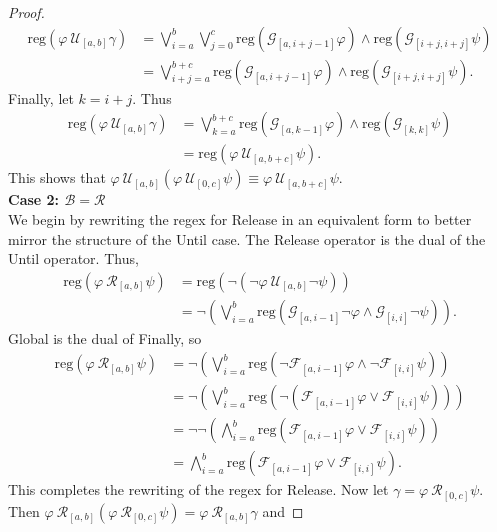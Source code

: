 \documentclass[runningheads]{llncs}
\renewcommand{\phi}{\varphi}
\begin{document}
\begin{proof}
\begin{align*}
\text{reg}\left(\phi \ \mathcal{U}_{[a,b]}\gamma\right) &= \bigvee_{i=a}^{b}  \bigvee_{j=0}^{c} \text{reg}\left(\mathcal{G}_{[a,i+j-1]}\phi\right) \land \text{reg}\left(\mathcal{G}_{[i+j, i+j]}\psi  \right)\\
&= \bigvee_{i+j=a}^{b+c} \text{reg}\left(\mathcal{G}_{[a,i+j-1]}\phi\right) \land \text{reg}\left(\mathcal{G}_{[i+j, i+j]}\psi  \right).
\end{align*}
Finally, let $k = i + j$. Thus
\begin{align*}
\text{reg}\left(\phi \ \mathcal{U}_{[a,b]}\gamma\right) &= \bigvee_{k=a}^{b+c} \text{reg}\left(\mathcal{G}_{[a,k-1]}\phi\right) \land \text{reg}\left(\mathcal{G}_{[k, k]}\psi  \right) \\
&= \text{reg}\left(\phi \ \mathcal{U}_{[a,b+c]} \psi\right).
\end{align*}
This shows that $\phi \ \mathcal{U}_{[a,b]}(\phi \ \mathcal{U}_{[0,c]} \psi) \equiv \phi \ \mathcal{U}_{[a,b+c]} \psi$.\\
\noindent \textbf{Case 2: $\mathbf{\mathcal{B} = \mathcal{R}}$} \\
We begin by rewriting the regex for Release in an equivalent form to better mirror the structure of the Until case. The Release operator is the dual of the Until operator. Thus,
\begin{align*}
\text{reg}\left(\phi \ \mathcal{R}_{[a,b]}\psi\right) &= \text{reg}\left(\neg\left(\neg\phi \ \mathcal{U}_{[a,b]}\neg\psi\right)\right) \\
&= \neg\left(\bigvee_{i=a}^{b} \text{reg}\left(\mathcal{G}_{[a,i-1]}\neg\phi \land \mathcal{G}_{[i, i]}\neg\psi\right)\right).
\end{align*}
Global is the dual of Finally, so
\begin{align*}
\text{reg}\left(\phi \ \mathcal{R}_{[a,b]}\psi\right) &= \neg\left(\bigvee_{i=a}^{b} \text{reg}\left(\neg\mathcal{F}_{[a,i-1]}\phi \land \neg\mathcal{F}_{[i, i]}\psi\right)\right)\\
&= \neg\left(\bigvee_{i=a}^{b} \text{reg}\left(\neg\left(\mathcal{F}_{[a,i-1]}\phi \lor \mathcal{F}_{[i, i]}\psi\right)\right)\right)\\
&= \neg\neg\left(\bigwedge_{i=a}^{b} \text{reg}\left(\mathcal{F}_{[a,i-1]}\phi \lor \mathcal{F}_{[i, i]}\psi\right)\right)\\
&= \bigwedge_{i=a}^{b} \text{reg}\left(\mathcal{F}_{[a,i-1]}\phi \lor \mathcal{F}_{[i, i]}\psi\right).
\end{align*}
This completes the rewriting of the regex for Release. Now let $\gamma = \phi \ \mathcal{R}_{[0,c]} \psi$. Then $\phi \ \mathcal{R}_{[a,b]}(\phi \ \mathcal{R}_{[0,c]} \psi) = \phi \ \mathcal{R}_{[a,b]}\gamma$ and

\end{proof}
\end{document}
